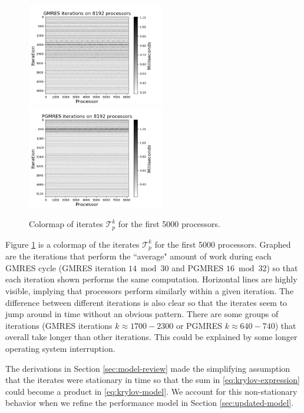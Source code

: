\documentclass[num-refs]{wiley-article}
\begin{document}
\begin{figure}[b]
\centering
\includegraphics[width=6cm]{../plots/GMRES_ex23_8192_1000000_stationary_in_t_colormap.png}
\includegraphics[width=6cm]{../plots/PGMRES_ex23_8192_1000000_stationary_in_t_colormap.png}
\caption{Colormap of iterates $\mathcal{T}_p^k$ for the first 5000 processors.} \label{fig:ex23-stationary}
\end{figure}




Figure \ref{fig:ex23-stationary} is a colormap of the iterates $\mathcal{T}_p^k$
for the first 5000 processors.
Graphed are the iterations that perform the ``average" amount of work during each GMRES cycle (GMRES iteration $14 \bmod 30$ and PGMRES $16 \bmod 32$) so that each iteration shown performs the same computation. 
Horizontal lines are highly visible, implying that processors perform similarly within a given iteration. 
The difference between different iterations is also clear so that the iterates seem to jump around in time without an obvious pattern.
There are some groups of iterations (GMRES iterations $k \approx 1700 - 2300$ or PGMRES $k \approx 640 - 740$) that overall take longer than other iterations. This could be explained by some longer operating system interruption.

The derivations in Section \ref{sec:model-review} made the simplifying assumption that the iterates were stationary in time so that the sum in \eqref{eq:krylov-expression} could become a product in \eqref{eq:krylov-model}. We account for this non-stationary behavior when we refine the performance model in Section \ref{sec:updated-model}.
\end{document}
